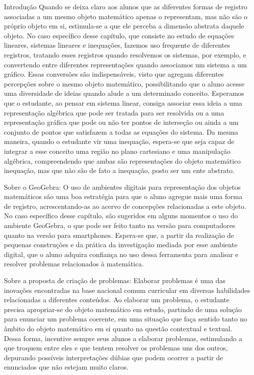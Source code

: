 \begin{apresentacao}{Introdução}
Quando se deixa claro aos alunos que as diferentes formas de registro associadas a um mesmo objeto matemático apenas o representam, mas não são o próprio objeto em si, estimula-se a que ele perceba a dimensão abstrata daquele objeto. No caso específico desse capítulo, que consiste no estudo de equações lineares, sistemas lineares e inequações, fazemos uso frequente de diferentes registros, tratando esses registros quando resolvemos os sistemas, por exemplo, e convertendo entre diferentes representações quando associamos um sistema a um gráfico. Essas conversões são indispensáveis, visto que agregam diferentes percepções sobre o mesmo objeto matemático, possibilitando que o aluno acesse uma diversidade de ideias quando alude a um determinado conceito. Esperamos que o estudante, ao pensar em sistema linear, consiga associar essa ideia a uma representação algébrica que pode ser tratada para ser resolvida ou a uma representação gráfica que pode ou não ter pontos de interseção ou ainda a um conjunto de pontos que satisfazem a todas as equações do sistema. Da mesma maneira, quando o estudante vir uma inequação, espera-se que seja capaz de integrar a esse conceito uma região no plano cartesiano e uma manipulação algébrica, compreendendo que ambas são representações do objeto matemático inequação, mas que não são de fato a inequação, posto ser um ente abstrato. 

Sobre o GeoGebra: O uso de ambientes digitais para representação dos objetos matemáticos são uma boa estratégia para que o aluno agregue mais uma forma de registro, acrescentando-as ao acervo de concepções relacionadas a este objeto. No caso específico desse capítulo, são sugeridos em alguns momentos o uso do ambiente GeoGebra, o que pode ser feito tanto na versão para computadores quanto na versão para smartphones. Espera-se que, a partir da realização de pequenas construções e da prática da investigação mediada por esse ambiente digital, que o aluno adquira confiança no uso dessa ferramenta para analisar e resolver problemas relacionados à matemática.

Sobre a proposta de criação de problemas: Elaborar problemas é uma das inovações encontradas na base nacional comum curricular em diversas habilidades relacionadas a diferentes conteúdos. Ao elaborar um problema, o estudante precisa apropriar-se do objeto matemático em estudo, partindo de uma solução para enunciar um problema coerente, em uma situação que faça sentido tanto no âmbito do objeto matemático em si quanto na questão contextual e textual. Dessa forma, incentive sempre seus alunos a elaborar problemas, estimulando a que troquem entre eles e que tentem resolver os problemas uns dos outros, depurando possíveis interpretações dúbias que podem ocorrer a partir de enunciados que não estejam muito claros.


\end{apresentacao}
